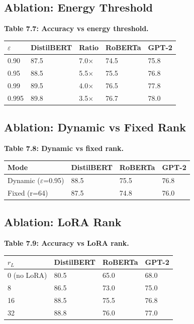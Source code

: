 \subsection{Ablation: Energy Threshold}

\textbf{Table 7.7: Accuracy vs energy threshold.}

\begin{table}[H]
\centering
\small
\begin{tabular}{lllll}
\toprule
\textbf{$\varepsilon$} & \textbf{DistilBERT} & \textbf{Ratio} & \textbf{RoBERTa} & \textbf{GPT-2} \\
\midrule
0.90 & 87.5 & 7.0$\times$ & 74.5 & 75.8 \\
0.95 & 88.5 & 5.5$\times$ & 75.5 & 76.8 \\
0.99 & 89.5 & 4.0$\times$ & 76.5 & 77.8 \\
0.995 & 89.8 & 3.5$\times$ & 76.7 & 78.0 \\
\bottomrule
\end{tabular}
\end{table}

\subsection{Ablation: Dynamic vs Fixed Rank}

\textbf{Table 7.8: Dynamic vs fixed rank.}

\begin{table}[H]
\centering
\small
\begin{tabular}{llll}
\toprule
\textbf{Mode} & \textbf{DistilBERT} & \textbf{RoBERTa} & \textbf{GPT-2} \\
\midrule
Dynamic ($\varepsilon$=0.95) & 88.5 & 75.5 & 76.8 \\
Fixed (r=64) & 87.5 & 74.8 & 76.0 \\
\bottomrule
\end{tabular}
\end{table}

\subsection{Ablation: LoRA Rank}

\textbf{Table 7.9: Accuracy vs LoRA rank.}

\begin{table}[H]
\centering
\small
\begin{tabular}{llll}
\toprule
\textbf{$r_L$} & \textbf{DistilBERT} & \textbf{RoBERTa} & \textbf{GPT-2} \\
\midrule
0 (no LoRA) & 80.5 & 65.0 & 68.0 \\
8 & 86.5 & 73.0 & 75.0 \\
16 & 88.5 & 75.5 & 76.8 \\
32 & 88.8 & 76.0 & 77.0 \\
\bottomrule
\end{tabular}
\end{table}

